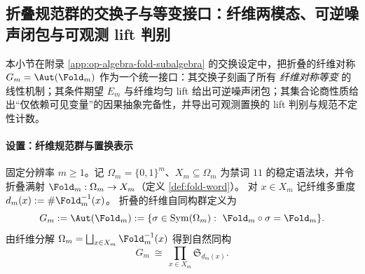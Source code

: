 \subsection{折叠规范群的交换子与等变接口：纤维两模态、可逆噪声闭包与可观测 lift 判别}\label{subsec:op-algebra-fold-gauge-commutant}
本小节在附录 \ref{app:op-algebra-fold-subalgebra} 的交换设定中，把折叠的纤维对称 \(G_m=\Aut(\Fold_m)\) 作为一个统一接口：其交换子刻画了所有 \emph{纤维对称等变} 的线性机制；其条件期望 \(E_m\) 与纤维均匀 lift 给出可逆噪声闭包；其集合论商性质给出“仅依赖可见变量”的因果抽象完备性，并导出可观测置换的 lift 判别与规范不定性计数。

\paragraph{设置：纤维规范群与置换表示}
固定分辨率 \(m\ge 1\)。记 \(\Omega_m=\{0,1\}^m\)、\(X_m\subseteq\Omega_m\) 为禁词 \(11\) 的稳定语法块，并令折叠满射 \(\Fold_m:\Omega_m\to X_m\)（定义 \ref{def:fold-word}）。
对 \(x\in X_m\) 记纤维多重度 \(d_m(x):=\#\Fold_m^{-1}(x)\)。
折叠的纤维自同构群定义为
\[
G_m:=\Aut(\Fold_m):=\{\sigma\in\mathrm{Sym}(\Omega_m):\ \Fold_m\circ\sigma=\Fold_m\}.
\]
由纤维分解 \( \Omega_m=\bigsqcup_{x\in X_m}\Fold_m^{-1}(x)\) 得到自然同构
\[
G_m\ \cong\ \prod_{x\in X_m}\mathfrak{S}_{d_m(x)}.
\]



